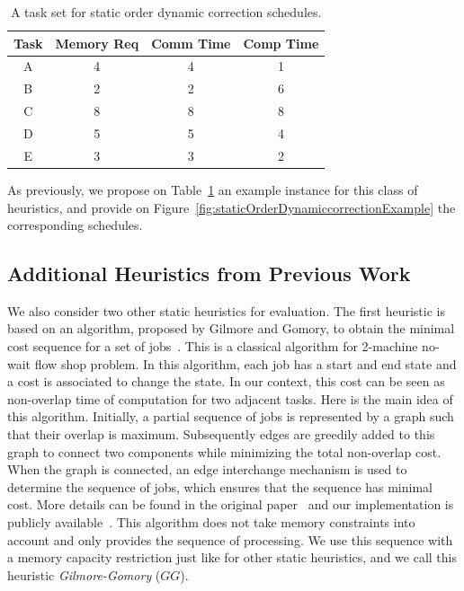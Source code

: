 \documentclass[sigconf]{acmart}
\begin{document}
\begin{table}[!htb]
	\begin{center}
		\begin{tabular}{|c|c|c|c|}
			\hline
			Task & Memory Req & Comm Time & Comp Time\\ \hline 
			A & 4 & 4 &  1\\ \hline
			B & 2 & 2 & 6\\ \hline
			C & 8 & 8 & 8\\ \hline
			D & 5 & 5 & 4\\ \hline
			E & 3 & 3 & 2\\ \hline
		\end{tabular}
		\caption{\label{tab:staticOrderDynamiccorrectionExample} A task set for static order dynamic correction schedules.\vspace*{-0.75cm}}
	\end{center}
\end{table}	


	
	As previously, we propose on Table~\ref{tab:staticOrderDynamiccorrectionExample} an example instance for this class of heuristics, and provide on Figure~\ref{fig:staticOrderDynamiccorrectionExample} the corresponding schedules.
	

	\subsection{Additional Heuristics from Previous Work}

We also consider two other static heuristics for evaluation. The first heuristic is based on an algorithm, proposed by Gilmore and Gomory, to obtain the minimal cost sequence for a set of jobs~\cite{Gilmore-Gomory:1964}. This is a classical algorithm for 2-machine no-wait flow shop problem. In this algorithm, each job has a start and end state and a cost is associated to change the state. In our context, this cost can be seen as non-overlap time of computation for two adjacent tasks. Here is the main idea of this algorithm. Initially, a partial sequence of jobs is represented by a graph such that their overlap is maximum. Subsequently edges are greedily added to this graph to connect two components while minimizing the total non-overlap cost. When the graph is  connected, an edge interchange mechanism is used to determine the sequence of jobs, which ensures that the sequence has minimal cost. More details can be found in the original paper~\cite{Gilmore-Gomory:1964} and our implementation is publicly available~\cite{gitworkrepo}. This algorithm does not take memory constraints into account and only provides the sequence of processing. We use this sequence with a memory capacity restriction just like for other static heuristics, and we call this heuristic \textit{Gilmore-Gomory} ($GG$).
\end{document}
